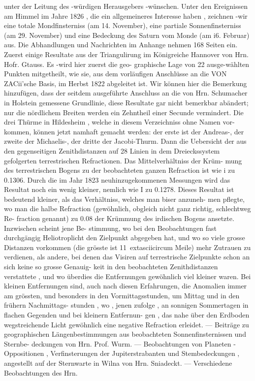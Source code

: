 \documentclass[12pt,a4paper]{article}
\begin{document}
{{{{{{{{unter  der  Leitung  des  -würdigen  Herausgebers  -wünschen.  Unter  den  Ereignissen  am  Himmel  im  Jahre 1826 ,  die  ein  allgemeineres  Interesse  haben ,  zeichnen  -wir  eine  totale  Mondfinsterniss  (am  14.  November), eine  partiale  Sonnenfinsterniss  (am  29.  November)  und  eine  Bedeckung  des  Saturn  vom  Monde  (am  i6. Februar)  aus. Die  Abhandlungen  und  Nachrichten  im  Anhange  nehmen  168  Seiten  ein.  Zuerst  einige  Resultate aus  der  Triangulirung  im  Königreiche  Hannover  von  Hrn.  Hofr.  Gtauss.  Es  -wird  hier  zuerst  die  geo- graphische Lage  von  22  ausge-wählten  Punkten  mitgetheilt,  wie  sie,  aus  dem  vorläufigen  Anschlüsse  an die  VON  ZACii'sche  Basis,  im  Herbst  1822  abgeleitet  ist.  Wir  können  hier  die  Bemerkung  hinzufügen, dass  der  seitdem  ausgeführte  Anschluss  an  die  von  Hrn.  Schumacher  in  Holstein  gemessene  Grundlinie, diese  Resultate  gar  nicht  bemerkbar  abändert;  nur  die  nördlichem  Breiten  werden  ein  Zehntheil  einer Secunde  vermindert.  Die  drei  Thürme  in  Hildesheim ,  welche  in  diesem  Verzeichniss  ohne  Namen  vor- kommen, können  jetzt  namhaft  gemacht  werden:  der  erste  ist  der  Andreas-,  der  zweite  der  Michaelis-, der  dritte  der  Jacobi-Thurm.  Dann  die  Uebersicht  der  aus  den  gegenseitigen  Zenithdistanzen  auf  28 Linien  in  dem  Dreieckssystem  gefolgerten  terrestrischen  Refractionen.  Das  Mittelverhältniss  der  Krüm- mung des  terrestrischen  Bogens  zu  der  beobachteten  ganzen  Refraction  ist  wie  i  zu  0.1306.  Durch  die im  Jahr  1823  neuhinzugekommenen  Messungen  wird  das  Resultat  noch  ein  wenig  kleiner,  nemlich  wie I  zu  0.1278.  Dieses  Resultat  ist  bedeutend  kleiner,  als  das  Verhältniss,  welches  man  biser  anzuneh- men pflegte,  wo  man  die  halbe  Refraction  (gewöhnlich,  obgleich  nicht  ganz  richtig,  schlechtweg  Re- fraction genannt)  zu  0.08  der  Krümmung  des  irdischen  Bogens  ansetzte.  Inzwischen  scheint  jene  Be- stimmung, wo  bei  den  Beobachtungen  fast  durchgängig  Heliotroplicht  den  Zielpunkt  abgegeben  hat, und  wo  so  viele  grosse  Distanzen  vorkommen  (die  grösste  ist  11\	extasciicircum{}{ }  Meile)  mehr  Zutrauen  zu  verdienen, als  andere,  bei  denen  das  Visiren  auf  terrestrische  Zielpunkte  schon  an  sich  keine  so  grosse  Genauig- keit in  den  beobachteten  Zenithdistanzen  verstattete ,  und  wo  überdies  die  Entfernungen  gewöhnlich  viel kleiner  waren.  Bei  kleinen  Entfernungen  sind,  auch  nach  diesen  Erfahrungen,  die  Anomalien  immer am  grössten,  und  besonders  in  den  Vormittagsstunden,  um  Mittag  und  in  den  frühern  Nachmittags- stunden ,  wo ,  jenen  zufolge ,  an  sonnigen  Sommertagen  in  flachen  Gegenden  und  bei  kleinern  Entfernun- gen ,  das  nahe  über  den  Erdboden  wegstreichende  Licht  gewöhnlich  eine  negative  Refraction  erleidet.  --- Beiträge  zu  geographischen  Längenbestimmungen  aus  beobachteten  Sonnenfinsternissen  und  Sternbe- deckungen von  Hrn.  Prof.  Wurm.  ---  Beobachtungen  von  Planeten  -  Oppositionen ,  Verfinsterungen  der Jupiterstrabanten  und  Stembedeckungen ,  angestellt  auf  der  Sternwarte  in  Wilna  von  Hrn.  Sniadeckt.  --- Verschiedene  Beobachtungen  des  Hrn.  }}}}}}}}
\end{document}
